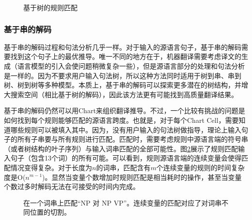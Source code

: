 \begin{figure}[htp]
\centering

\caption{基于树的规则匹配}
\label{fig:4-69}
\end{figure}


\subsubsection{基于串的解码}

\parinterval 基于串的解码过程和句法分析几乎一样。对于输入的源语言句子，基于串的解码需要找到这个句子上的最优推导。唯一不同的地方在于，机器翻译需要考虑译文的生成（语言模型的引入会使问题稍微复杂一些），但是源语言部分的处理和句法分析是一样的。因为不要求用户输入句法树，所以这种方法同时适用于树到串、串到树、树到树等多种模型。本质上，基于串的解码可以探索更多潜在的树结构，并增大搜索空间（相比基于树的解码），因此该方法更有可能找到高质量翻译结果。

\parinterval 基于串的解码仍然可以用Chart来组织翻译推导。不过，一个比较有挑战的问题是如何找到每个规则能够匹配的源语言跨度。也就是，对于每个Chart Cell，需要知道哪些规则可以被填入其中。因为，没有用户输入的句法树做指导，理论上输入句子的所有子串要与所有规则进行匹配。匹配时，需要考虑规则中源语言端的符号串（或者树结构的叶子序列）与输入词串匹配的全部可能性。图\ref{fig:4-70}展示了规则匹配输入句子（包含13个词）的所有可能。可以看到，规则源语言端的连续变量会使得匹配情况变得复杂。对于长度为$n$的词串，匹配含有$m$个连续变量的规则的时间复杂度是O($n^{m-1}$)。显然当变量个数增加时规则匹配是相当耗时的操作，甚至当变量个数过多时解码无法在可接受的时间内完成。

\begin{figure}[htp]
\centering

\caption{在一个词串上匹配``NP 对 NP VP''。连续变量的匹配对应了对词串不同位置的切割。}
\label{fig:4-70}
\end{figure}

